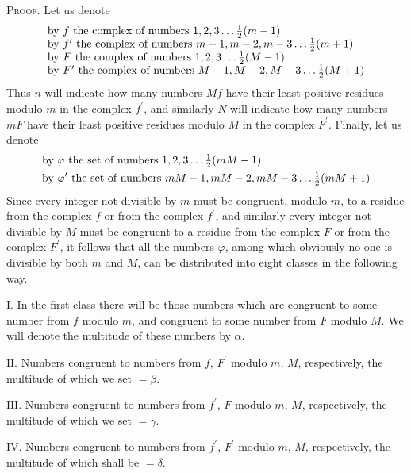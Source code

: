 \documentclass[twoside,12pt]{memoir}
\let\oldfrac\frac
\def\frac#1#2{\mathchoice{\tfrac{#1}{#2}}{\oldfrac{#1}{#2}}{\genfrac{}{}{}{2}{#1}{#2\mathstrut}}{\genfrac{}{}{}{3}{#1}{#2\mathstrut}}}
\begin{document}
\textsc{Proof.} Let us denote
\[\begin{array}{l}
\text{by }f\text{ the complex of numbers }1,2,3 \ldots \frac{1}{2}(m-1) \\
\text{by }f^{\prime}\text{ the complex of numbers }m-1, m-2, m-3 \ldots \frac{1}{2}(m+1) \\
\text{by }F\text{ the complex of numbers }1,2,3 \ldots \frac{1}{2}({M}-1) \\
\text{by }F^{\prime}\text{ the complex of numbers }M-1, M-2, M-3 \ldots \frac{1}{2}(M+1)\\ 
\end{array}\]
Thus \(n\) will indicate how many numbers \(M f\) have their least positive residues modulo \(m\) in the complex \(f^{\prime}\), and similarly \(N\) will indicate how many numbers \(m F\) have their least positive residues modulo \(M\) in the complex \(F^{\prime}\). Finally, let us denote
\[\begin{aligned}
&\text{by }\varphi\text{ the set of numbers }1, 2, 3 \ldots \frac{1}{2}(m M-1)\\
&\text{by }\varphi^{\prime}\text{ the set of numbers }m M-1, m M-2, m M-3 \ldots \frac{1}{2}(m M+1)
\end{aligned}\]
Since every integer not divisible by \(m\) must be congruent, modulo \(m\), to a residue from the complex \(f\) or from the complex \(f^{\prime}\), and similarly every integer not divisible by \(M\) must be congruent to a residue from the complex \(F\) or from the complex \(F^{\prime}\), it follows that all the numbers \(\varphi\), among which obviously no one is divisible by both \(m\) and \(M\), can be distributed into eight classes in the following way.

\(\text{I.}\) In the first class there will be those numbers which are congruent to some number from \(f\) modulo \(m\), and congruent to some number from \(F\) modulo \(M\). We will denote the multitude of these numbers by \(\alpha\).\pagebreak%

\(\text{II.}\) Numbers congruent to numbers from \(f\), \(F^{\prime}\) modulo \(m\), \(M\), respectively, the multitude of which we set \(=\beta\).

\(\text{III.}\) Numbers congruent to numbers from \(f^{\prime}\), \(F\) modulo \(m\), \(M\), respectively, the multitude of which we set \(=\gamma\).

\(\text{IV.}\) Numbers congruent to numbers from \(f^{\prime}\), \(F^{\prime}\) modulo \(m\), \(M\), respectively, the multitude of which shall be \(=\delta\).
\end{document}
